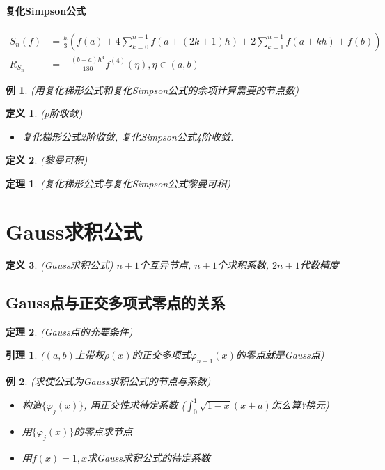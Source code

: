 \documentclass[twoside]{article}
\newtheorem{theorem}{定理}[section]
\newtheorem{lemma}{引理}[section]
\newtheorem{definition}{定义}[section]
\newtheorem{eg}{例}[section]
\begin{document}
\paragraph{复化Simpson公式}
\begin{equation}
  \begin{aligned}
    S_n(f) &= \frac{h}{3} \left( f(a) + 4\sum^{n-1}_{k=0} f(a+(2k+1)h) + 2\sum^{n-1}_{k=1} f(a+kh) + f(b) \right)\\
    R_{S_n} &= - \frac{(b-a)h^4}{180} f^{(4)}(\eta), \eta\in(a,b)
  \end{aligned}
\end{equation}
\begin{eg}
  (用复化梯形公式和复化Simpson公式的余项计算需要的节点数)
\end{eg}
\begin{definition}
  ($p$阶收敛)
  \begin{itemize}
    \item 复化梯形公式2阶收敛, 复化Simpson公式4阶收敛.
  \end{itemize}
\end{definition}
\begin{definition}
  (黎曼可积)
\end{definition}
\begin{theorem}
  (复化梯形公式与复化Simpson公式黎曼可积)
\end{theorem}

\section{Gauss求积公式}
\begin{definition}
  (Gauss求积公式)
  $n+1$个互异节点, $n+1$个求积系数, $2n+1$代数精度
\end{definition}
\subsection{Gauss点与正交多项式零点的关系}
\begin{theorem}
  (Gauss点的充要条件)
\end{theorem}
\begin{lemma}
  ($(a,b)$上带权$\rho(x)$的正交多项式$\varphi_{n+1}(x)$的零点就是Gauss点)
\end{lemma}
\begin{eg}
  (求使公式为Gauss求积公式的节点与系数)
  \begin{itemize}
    \item 构造$\{\varphi_j(x)\}$, 用正交性求待定系数 ($\int_0^1 \sqrt{1-x}(x+a)$怎么算?换元)
    \item 用$\{\varphi_j(x)\}$的零点求节点
    \item 用$f(x)=1, x$求Gauss求积公式的待定系数
  \end{itemize}
\end{eg}
\end{document}

